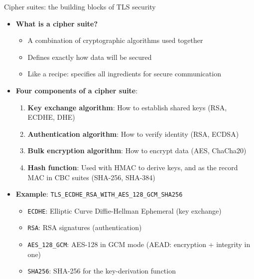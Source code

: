 \ifdefined\PRESENTATION\else\PassOptionsToClass{handout}{beamer}\fi\documentclass[aspectratio=169, lualatex]{beamer}
\begin{document}
\begin{frame}{Cipher suites: the building blocks of TLS security}
	\begin{itemize}[<+->]
		\item \textbf{What is a cipher suite?}
		      \begin{itemize}
			      \item A combination of cryptographic algorithms used together
			      \item Defines exactly how data will be secured
			      \item Like a recipe: specifies all ingredients for secure communication
		      \end{itemize}
		\item \textbf{Four components of a cipher suite}:
		      \begin{enumerate}
			      \item \textbf{Key exchange algorithm}: How to establish shared keys (RSA, ECDHE, DHE)
			      \item \textbf{Authentication algorithm}: How to verify identity (RSA, ECDSA)
			      \item \textbf{Bulk encryption algorithm}: How to encrypt data (AES, ChaCha20)
			      \item \textbf{Hash function}: Used with HMAC to derive keys, and as the record MAC in CBC suites (SHA-256, SHA-384)
		      \end{enumerate}
		\item \textbf{Example}: \texttt{TLS\_ECDHE\_RSA\_WITH\_AES\_128\_GCM\_SHA256}
		      \begin{itemize}
			      \item \texttt{ECDHE}: Elliptic Curve Diffie-Hellman Ephemeral (key exchange)
			      \item \texttt{RSA}: RSA signatures (authentication)
			      \item \texttt{AES\_128\_GCM}: AES-128 in GCM mode (AEAD: encryption + integrity in one)
			      \item \texttt{SHA256}: SHA-256 for the key-derivation function
		      \end{itemize}
	\end{itemize}
\end{frame}
\end{document}
